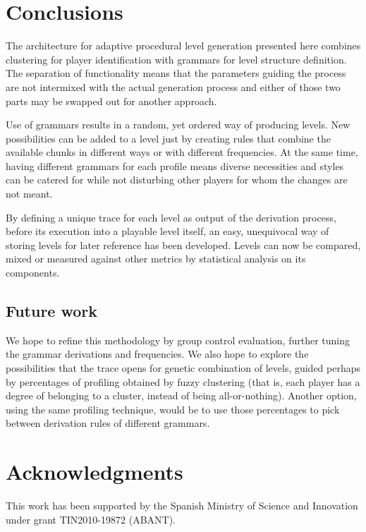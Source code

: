 \documentclass[conference]{IEEEtran}
\begin{document}
\section{Conclusions}

The architecture for adaptive procedural level generation presented here combines clustering for player identification with grammars for level structure definition. The separation of functionality means that the parameters guiding the process are not intermixed with the actual generation process and either of those two parts may be swapped out for another approach.

Use of grammars results in a random, yet ordered way of producing levels. New possibilities can be added to a level just by creating rules that combine the available chunks in different ways or with different frequencies. At the same time, having different grammars for each profile means diverse necessities and styles can be catered for while not disturbing other players for whom the changes are not meant.

By defining a unique trace for each level as output of the derivation process, before its execution into a playable level itself, an easy, unequivocal way of storing levels for later reference has been developed. Levels can now be compared, mixed or measured against other metrics by statistical analysis on its components.  

\subsection*{Future work}

We hope to refine this methodology by group control evaluation, further tuning the grammar derivations and frequencies. We also hope to explore the possibilities that the trace opens for genetic combination of levels, guided perhaps by percentages of profiling obtained by fuzzy clustering (that is, each player has a degree of belonging to a cluster, instead of being all-or-nothing). Another option, using the same profiling technique, would be to use those percentages to pick between derivation rules of different grammars.

\section*{Acknowledgments}
This work has been supported by the
Spanish Ministry of Science and Innovation under grant
TIN2010-19872 (ABANT).

\end{document}
